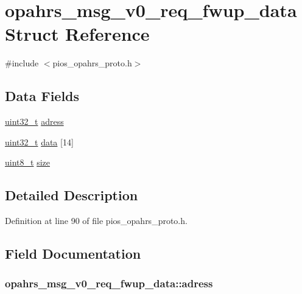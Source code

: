 \hypertarget{structopahrs__msg__v0__req__fwup__data}{\section{opahrs\-\_\-msg\-\_\-v0\-\_\-req\-\_\-fwup\-\_\-data Struct Reference}
\label{structopahrs__msg__v0__req__fwup__data}
}


{\ttfamily \#include $<$pios\-\_\-opahrs\-\_\-proto.\-h$>$}

\subsection*{Data Fields}
\begin{DoxyCompactItemize}
\item 
\hyperlink{stdint_8h_a435d1572bf3f880d55459d9805097f62}{uint32\-\_\-t} \hyperlink{structopahrs__msg__v0__req__fwup__data_afca258c271264dc27cab56d0cfbe28f1}{adress}
\item 
\hyperlink{stdint_8h_a435d1572bf3f880d55459d9805097f62}{uint32\-\_\-t} \hyperlink{structopahrs__msg__v0__req__fwup__data_aed597f47669351e5b689a79755b1f152}{data} \mbox{[}14\mbox{]}
\item 
\hyperlink{stdint_8h_aba7bc1797add20fe3efdf37ced1182c5}{uint8\-\_\-t} \hyperlink{structopahrs__msg__v0__req__fwup__data_a64e3045d330fdaa9b0931dea2e7e0e4a}{size}
\end{DoxyCompactItemize}


\subsection{Detailed Description}


Definition at line 90 of file pios\-\_\-opahrs\-\_\-proto.\-h.



\subsection{Field Documentation}
\hypertarget{structopahrs__msg__v0__req__fwup__data_afca258c271264dc27cab56d0cfbe28f1}{
\subsubsection[{adress}]{ opahrs\-\_\-msg\-\_\-v0\-\_\-req\-\_\-fwup\-\_\-data\-::adress}}\label{structopahrs__msg__v0__req__fwup__data_afca258c271264dc27cab56d0cfbe28f1}


